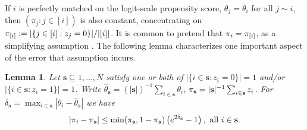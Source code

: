 \documentclass{article}
\newtheorem{lemma}{Lemma}
\theoremstyle{remark}
\begin{document}
If $i$ is perfectly matched on the logit-scale propensity score, $\theta_{j} = 
\theta_i$ for all  $j \sim i$, then $(\pi_{j}: j \in [i] )$ is also constant, concentrating on $\pi_{ [i]}:= |\{j \in [i]: z_{j}=0 \}|/|[i]|$.  It is common to pretend that $\pi_{i} = \pi_{ [i]}$, as a simplifying assumption \citep[\textit{e.g.}][]{rubin:1991,rosenbaum2010design}.  The following lemma characterizes one important aspect of the error that assumption incurs.

\begin{lemma} \label{lem:msPSerr}
Let $\mathbf{s} \subseteq 1, \ldots, N$ satisfy one or both of $|\{i \in \mathbf{s}: z_{i} =0\}| = 1$ and/or $|\{i \in \mathbf{s}: z_{i} =1\}| = 1$.  Write $\hat{\theta}_{\mathbf{s}} = (|\mathbf{s}|)^{-1} \sum_{i \in \mathbf{s}} \theta_{i}$, $\pi_{ \mathbf{s}}  = |\mathbf{s}|^{-1} \sum_{i \in \mathbf{s}} z_i$. 
For $\delta_\mathbf{s} = \max_{i \in \mathbf{s}} |\theta_i - \bar{\theta}_{\mathbf{s}}| $ we have
\begin{equation}
  \label{eq:24}
  |\pi_{i}  - \pi_{ \mathbf{s}} |  \leq \min(\pi_{ \mathbf{s}}, 1-\pi_{ \mathbf{s}}) \left(e^{2\delta_\mathbf{s}}  -1 \right),\,\, \mathrm{all}\,\, i \in \mathbf{s}.
\end{equation}
\end{lemma}
\end{document}
